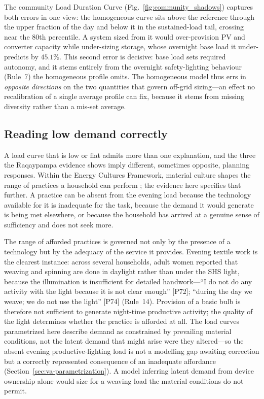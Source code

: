\documentclass[final,3p,times,onecolumn]{elsarticle}
\begin{document}
The community Load Duration Curve (Fig.~\ref{fig:community_shadows}) captures both errors in one view: the homogeneous curve sits above the reference through the upper fraction of the day and below it in the sustained-load tail, crossing near the 80th percentile. A system sized from it would over-provision PV and converter capacity while under-sizing storage, whose overnight base load it under-predicts by $45.1\%$. This second error is decisive: base load sets required autonomy, and
it stems entirely from the overnight safety-lighting behaviour (Rule~7) the homogeneous profile omits. The homogeneous model thus errs in \emph{opposite directions} on the two quantities that govern off-grid sizing---an effect no recalibration of a single average profile can fix, because it stems from missing diversity rather than a mis-set average.

\subsection{Reading low demand correctly}
\label{sec:reading_low_demand}

A load curve that is low or flat admits more than one explanation, and the three the Raqaypampa evidence shows imply different, sometimes opposite, planning responses. Within the Energy Cultures Framework, material culture shapes the range of practices a household can perform \citep{stephenson_energy_2015}; the evidence here specifies that further. A practice can be absent from the evening load because the technology available for it is inadequate for the task, because the demand it would generate is being met elsewhere, or because the household has arrived at a genuine sense of sufficiency and does not seek more.

The range of afforded practices is governed not only by the presence of a technology but by the adequacy of the service it provides. Evening textile work is the clearest instance: across several households, adult women reported that weaving and spinning are done in daylight rather than under the SHS light, because the illumination is insufficient for detailed handwork---``I do not do any activity with the light because it is not clear enough'' [P72]; ``during the day we weave; we do not use the light'' [P74] (Rule~14). Provision of a basic bulb is therefore not sufficient to generate night-time productive activity; the quality of the light determines whether the practice is afforded at all. The load curves parametrized here describe demand as constrained by prevailing material conditions, not the latent demand that might arise were they altered---so the absent evening productive-lighting load is not a modelling gap awaiting correction but a correctly represented consequence of an inadequate affordance (Section~\ref{sec:va-parametrization}). A model inferring latent demand from device ownership alone would size for a weaving load the material conditions do not permit.
\end{document}

